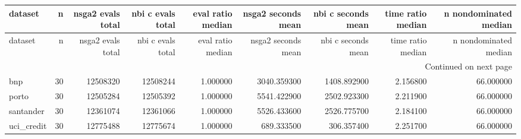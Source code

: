 \begin{landscape}
\begin{center}\label{tab:s13bud}\end{center}
\begingroup\tiny\setlength{\tabcolsep}{2.5pt}
\begin{longtable}{lrrrrrrrr}
\toprule
dataset & n & nsga2 evals total & nbi c evals total & eval ratio median & nsga2 seconds mean & nbi c seconds mean & time ratio median & n nondominated median \\
\midrule
\endfirsthead
\toprule
dataset & n & nsga2 evals total & nbi c evals total & eval ratio median & nsga2 seconds mean & nbi c seconds mean & time ratio median & n nondominated median \\
\midrule
\endhead
\midrule
\multicolumn{9}{r}{Continued on next page} \\
\midrule
\endfoot
\bottomrule
\endlastfoot
bnp & 30 & 12508320 & 12508244 & 1.000000 & 3040.359300 & 1408.892900 & 2.156800 & 66.000000 \\
porto & 30 & 12505284 & 12505392 & 1.000000 & 5541.422900 & 2502.923300 & 2.211900 & 66.000000 \\
santander & 30 & 12361074 & 12361066 & 1.000000 & 5526.433600 & 2526.775700 & 2.184100 & 66.000000 \\
uci\_credit & 30 & 12775488 & 12775674 & 1.000000 & 689.333500 & 306.357400 & 2.251700 & 66.000000 \\
\end{longtable}\endgroup\addtocounter{table}{-1}

\end{landscape}
